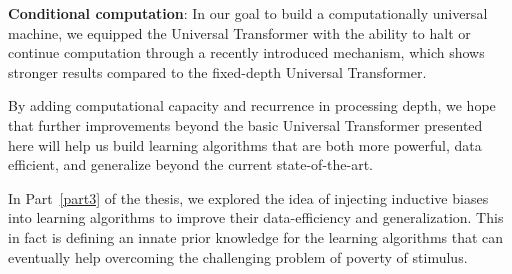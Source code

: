 \textbf{Conditional computation}: In our goal to build a computationally universal machine, we equipped the Universal Transformer with the ability to halt or continue computation through a recently introduced mechanism, which shows stronger results compared to the fixed-depth Universal Transformer.

By adding computational capacity and recurrence in processing depth, we hope that further improvements beyond the basic Universal Transformer presented here will help us build learning algorithms that are both more powerful, data efficient, and generalize beyond the current state-of-the-art.

In Part~\ref{part3} of the thesis, we explored the idea of injecting inductive biases into learning algorithms to improve their data-efficiency and generalization. This in fact is defining an innate prior knowledge for the learning algorithms that can eventually help overcoming the challenging problem of poverty of stimulus.